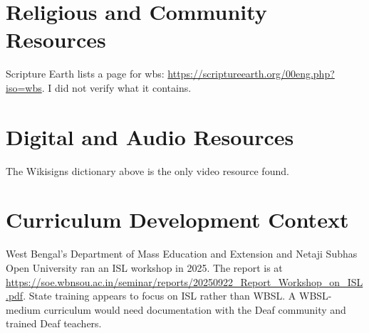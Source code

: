 \documentclass[12pt]{article}
\begin{document}
\section{Religious and Community Resources}
Scripture Earth lists a page for wbs: \url{https://scriptureearth.org/00eng.php?iso=wbs}. I did not verify what it contains.

\section{Digital and Audio Resources}
The Wikisigns dictionary above is the only video resource found.

\section{Curriculum Development Context}
West Bengal's Department of Mass Education and Extension and Netaji Subhas Open University ran an ISL workshop in 2025. The report is at \url{https://soe.wbnsou.ac.in/seminar/reports/20250922_Report_Workshop_on_ISL.pdf}. State training appears to focus on ISL rather than WBSL. A WBSL-medium curriculum would need documentation with the Deaf community and trained Deaf teachers.
\end{document}
